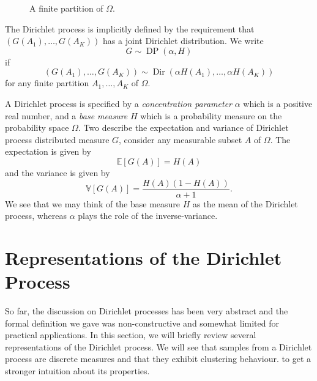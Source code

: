 \documentclass[final,3p,times,twocolumn]{elsarticle}
\DeclareMathOperator*{\Dir}{Dir}
\DeclareMathOperator*{\DP}{DP}
\begin{document}
\begin{figure}
\caption{A finite partition of $\Omega$.}
\label{fig:partition}
\end{figure}

The Dirichlet process is implicitly defined by the requirement that $(G(A_1), \dots, G(A_K))$ has a joint Dirichlet distribution.
We write 
\[G \sim \DP(\alpha,H)\]
if 
\begin{equation}
\label{eqn:dpdef}
(G(A_1),\dots,G(A_K)) \sim \Dir(\alpha H(A_1), \dots, \alpha H(A_K))
\end{equation}
for any finite partition $A_1,\dots,A_K$ of $\Omega$.

A Dirichlet process is specified by a \emph{concentration parameter} $\alpha$ which is a positive real number, and a \emph{base measure} $H$ which is a probability measure on the probability space $\Omega$.
Two describe the expectation and variance of Dirichlet process distributed measure $G$, consider any measurable subset $A$ of $\Omega$. 
The expectation is given by
\begin{equation}
\label{eqn:meandp}
\mathbb{E}\left[G(A)\right] = H(A)
\end{equation}
and the variance is given by
\begin{equation}
\label{eqn:vardp}
\mathbb{V}\left[G(A)\right] = \frac{H(A)(1-H(A))}{\alpha + 1}.
\end{equation}
We see that we may think of the base measure $H$ as the mean of the Dirichlet process, whereas $\alpha$ plays the role of the inverse-variance.

\section{Representations of the Dirichlet Process}
\label{sect:representations}
So far, the discussion on Dirichlet processes has been very abstract and the formal definition we gave was non-constructive and somewhat limited for practical applications. 
In this section, we will briefly review several representations of the Dirichlet process.
We will see that samples from a Dirichlet process are discrete measures and that they exhibit clustering behaviour.
to get a stronger intuition about its properties.
\end{document}
